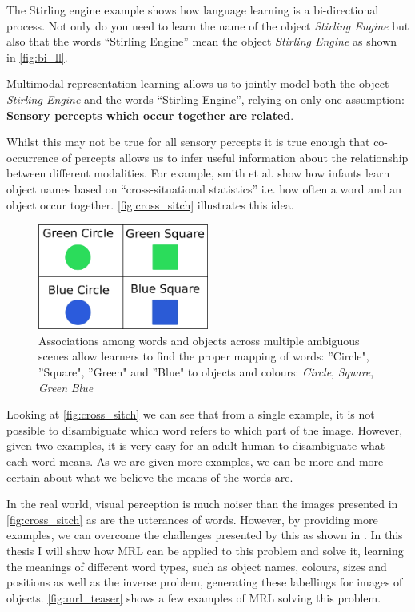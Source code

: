 The Stirling engine example shows how language learning is a bi-directional process. Not only do you need to learn the name of the object \textit{Stirling Engine} but also that the words ``Stirling Engine'' mean the object \textit{Stirling Engine} as shown in \autoref{fig:bi_ll}. 

Multimodal representation learning allows us to jointly model both the object \textit{Stirling Engine} and the words ``Stirling Engine'', relying on only one assumption: \textbf{Sensory percepts which occur together are related}.

Whilst this may not be true for all sensory percepts it is true enough that co-occurrence of percepts allows us to infer useful information about the relationship between different modalities. For example, smith et al. \cite{smith2008infants} show how infants learn object names based on ``cross-situational statistics'' i.e. how often a word and an object occur together. \autoref{fig:cross_sitch} illustrates this idea.

\begin{figure}[h]
\centering
\includegraphics[width=0.5\textwidth]{Figs/introduction/shapes.png}
\caption{Associations among words and objects across multiple ambiguous scenes allow learners to find the proper mapping of words:
''Circle", ''Square", ''Green" and ''Blue" to objects and colours: \textit{Circle},  \textit{Square},  \textit{Green}  \textit{Blue}}
\label{fig:cross_sitch}
\end{figure}

Looking at \autoref{fig:cross_sitch} we can see that from a single example, it is not possible to disambiguate which word refers to which part of the image. However, given two examples, it is very easy for an adult human to disambiguate what each word means. As we are given more examples, we can be more and more certain about what we believe the means of the words are. 

In the real world, visual perception is much noiser than the images presented in \autoref{fig:cross_sitch} as are the utterances of words. However, by providing more examples, we can overcome the challenges presented by this as shown in \cite{yurovsky2013statistical}. In this thesis I will show how MRL can be applied to this problem and solve it, learning the meanings of different word types, such as object names, colours, sizes and positions as well as the inverse problem, generating these labellings for images of objects. \autoref{fig:mrl_teaser} shows a few examples of MRL solving this problem.

